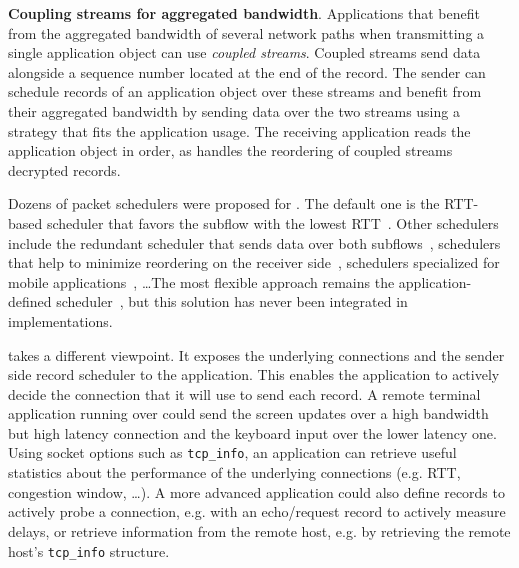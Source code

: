 

\textbf{Coupling streams for aggregated bandwidth}.
Applications that benefit from the aggregated bandwidth of several network paths when transmitting a single application object can use \tcpls \textit{coupled streams}. Coupled streams send data alongside a sequence number located at the end of the record. The sender can schedule \tcpls records of an application object over these streams and benefit from their aggregated bandwidth by sending data over the two streams using a strategy that fits the application usage. The receiving application reads the application object in order, as \tcpls handles the reordering of coupled streams decrypted records.

Dozens of packet schedulers were proposed for \mptcp. The default one is the
RTT-based scheduler that favors the subflow with the lowest RTT~\cite{paasch2014experimental}. Other schedulers include the redundant
scheduler that sends data over both subflows~\cite{frommgen2016remp}, schedulers that help to minimize reordering on the receiver side~\cite{lim2017ecf,hurtig2018low}, schedulers specialized for mobile
applications~\cite{de2018tuning}, \ldots The most flexible approach remains the application-defined \mptcp scheduler~\cite{frommgen2017programming}, but this solution has never been integrated in \mptcp implementations.

\tcpls takes a different viewpoint. It exposes the underlying \tcp connections
and the sender side \tcpls record scheduler to the application. This enables
the application to actively decide the \tcp connection that it will use to send
each record. A remote terminal application running over \tcpls could send the
screen updates over a high bandwidth but high latency connection and the
keyboard input over the lower latency one.
Using socket options such as
\texttt{tcp\_info}, an application can retrieve useful statistics about the
performance of the underlying \tcp connections (e.g. RTT, congestion window,
\ldots). %
A more advanced application could also define \tcpls records to actively
probe a connection, e.g. with an echo/request record to actively measure
delays, or retrieve information from the remote host, e.g. by retrieving the
remote host's \texttt{tcp\_info} structure.

